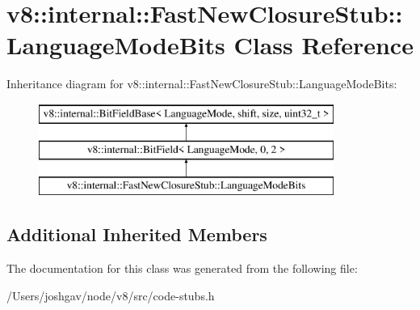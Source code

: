 \hypertarget{classv8_1_1internal_1_1_fast_new_closure_stub_1_1_language_mode_bits}{}\section{v8\+:\+:internal\+:\+:Fast\+New\+Closure\+Stub\+:\+:Language\+Mode\+Bits Class Reference}
\label{classv8_1_1internal_1_1_fast_new_closure_stub_1_1_language_mode_bits}
Inheritance diagram for v8\+:\+:internal\+:\+:Fast\+New\+Closure\+Stub\+:\+:Language\+Mode\+Bits\+:\begin{figure}[H]
\begin{center}
\leavevmode
\includegraphics[height=3.000000cm]{classv8_1_1internal_1_1_fast_new_closure_stub_1_1_language_mode_bits}
\end{center}
\end{figure}
\subsection*{Additional Inherited Members}


The documentation for this class was generated from the following file\+:\begin{DoxyCompactItemize}
\item 
/\+Users/joshgav/node/v8/src/code-\/stubs.\+h\end{DoxyCompactItemize}
